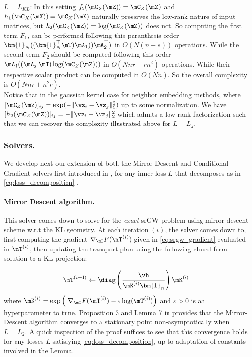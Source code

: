 \underline{$L=L_{KL}$}: In this setting $f_2(\mC_Z(\mZ)) = \mC_Z(\mZ)$ and $h_1(\mC_X(\mX)) = \mC_X(\mX)$ naturally preserves the low-rank nature of input matrices, but $h_2(\mC_Z(\mZ)) = \log(\mC_Z(\mZ))$ does not. So computing the first term $F_1$, can be performed following this paranthesis order $\bm{1}_N ((  \bm{1}_N^\top \mT) \mA_1)) \mA_2^\top) $ in $O(N(n + s))$ operations. While the second term $F_2$ should be computed following this order $\mA_1 ((\mA_2^\top \mT)  \log(\mC_Z(\mZ)))$ in $O(Nnr + rn^2)$ operations. While their respective scalar product can be computed in $O(Nn)$. So the overall complexity is $O(Nnr + n^2r)$.\\
Notice that in the gaussian kernel case for neighbor embedding methods, where $[\mC_Z(\mZ)]_{ij} = \exp(-\|\vz_i-\vz_j\|_2^2)$ up to some normalization. We have $[h_2(\mC_Z(\mZ))]_{ij} = -\|\vz_i-\vz_j\|_2^2$ which admits a low-rank factorization such that we can recover the complexity illustrated above for $L=L_2$.

\subsubsection{Solvers.}
We develop next our extension of both the Mirror Descent and Conditional Gradient solvers first introduced in \cite{vincent2021semi}, for any inner loss $L$ that decomposes as in \eqref{eq:loss_decomposition} .

\paragraph{Mirror Descent algorithm.} This solver comes down to solve for the \emph{exact} srGW problem using mirror-descent scheme w.r.t the KL geometry. At each iteration $(i)$, the solver comes down to, first computing the gradient $\nabla_{\mT}F(\mT^{(i)})$ given in \eqref{eq:srgw_gradient} evaluated in $\mT^{(i)}$, then updating the transport plan using the following closed-form solution to a KL projection:

\begin{equation}
\mT^{(i+1)} \leftarrow \diag\left( \frac{\vh}{\mK^{(i)}\bm{1}_n} \right) \mK^{(i)}
\end{equation}
where $\mK^{(i)} = \exp \left(\ \nabla_{\mT}F(\mT^{(i)}) - \varepsilon \log(\mT^{(i)})  \right)$ and $\varepsilon > 0$ is an hyperparameter to tune. Proposition 3 and Lemma 7 in \cite[Chapter 6]{vincent2023optimal} provides that the Mirror-Descent algorithm converges to a stationary point non-asymptotically when $L=L_2$. A quick inspection of the proof suffices to see that this convergence holds for any losses $L$ satisfying \eqref{eq:loss_decomposition}, up to adaptation of constants involved in the Lemma.

